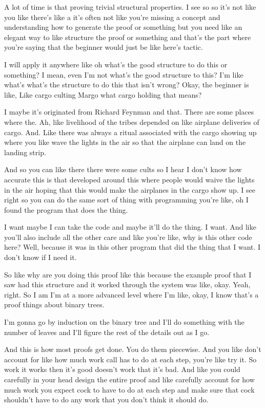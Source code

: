 \begin{subappendices}
A lot of time is that proving trivial structural properties. I see so so it's not like you like there's like a it's often not like you're missing a concept and understanding how to generate the proof or something but you need like an elegant way to like structure the proof or something and that's the part where you're saying that the beginner would just be like here's tactic.

I will apply it anywhere like oh what's the good structure to do this or something? I mean, even I'm not what's the good structure to this? I'm like what's what's the structure to do this that isn't wrong? Okay, the beginner is like, Like cargo culting Margo what cargo holding that means?

I maybe it's originated from Richard Feynman and that. There are some places where the. Ah, like livelihood of the tribes depended on like airplane deliveries of cargo. And. Like there was always a ritual associated with the cargo showing up where you like wave the lights in the air so that the airplane can land on the landing strip.

And so you can like there there were some cults so I hear I don't know how accurate this is that developed around this where people would waive the lights in the air hoping that this would make the airplanes in the cargo show up. I see right so you can do the same sort of thing with programming you're like, oh I found the program that does the thing.

I want maybe I can take the code and maybe it'll do the thing. I want. And like you'll also include all the other care and like you're like, why is this other code here? Well, because it was in this other program that did the thing that I want. I don't know if I need it.

So like why are you doing this proof like this because the example proof that I saw had this structure and it worked through the system was like, okay. Yeah, right. So I am I'm at a more advanced level where I'm like, okay, I know that's a proof things about binary trees.

I'm gonna go by induction on the binary tree and I'll do something with the number of leaves and I'll figure the rest of the details out as I go.

And this is how most proofs get done. You do them piecewise. And you like don't account for like how much work call has to do at each step, you're like try it. So work it works then it's good doesn't work that it's bad. And like you could carefully in your head design the entire proof and like carefully account for how much work you expect cock to have to do at each step and make sure that cock shouldn't have to do any work that you don't think it should do.


\end{subappendices}
